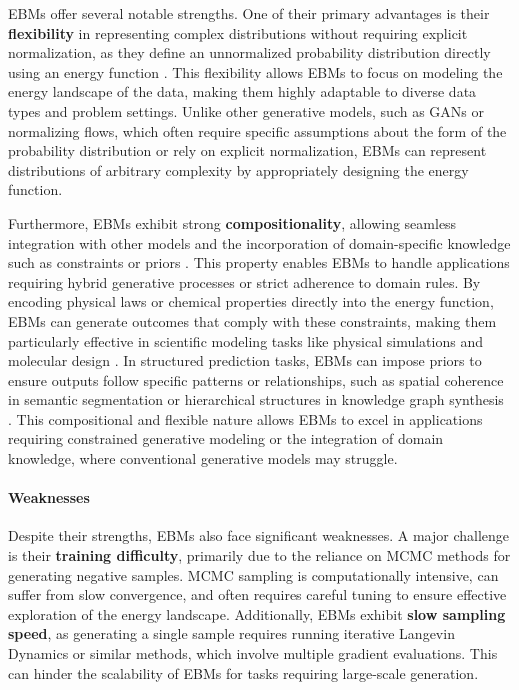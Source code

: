 EBMs offer several notable strengths. One of their primary advantages is their \textbf{flexibility} in representing complex distributions without requiring explicit normalization, as they define an unnormalized probability distribution directly using an energy function \cite{lecun2006tutorial}. This flexibility allows EBMs to focus on modeling the energy landscape of the data, making them highly adaptable to diverse data types and problem settings. Unlike other generative models, such as GANs or normalizing flows, which often require specific assumptions about the form of the probability distribution or rely on explicit normalization, EBMs can represent distributions of arbitrary complexity by appropriately designing the energy function.

Furthermore, EBMs exhibit strong \textbf{compositionality}, allowing seamless integration with other models and the incorporation of domain-specific knowledge such as constraints or priors \cite{du2019implicit, grathwohl2020your}. This property enables EBMs to handle applications requiring hybrid generative processes or strict adherence to domain rules. By encoding physical laws or chemical properties directly into the energy function, EBMs can generate outcomes that comply with these constraints, making them particularly effective in scientific modeling tasks like physical simulations and molecular design \cite{du2019implicit}. In structured prediction tasks, EBMs can impose priors to ensure outputs follow specific patterns or relationships, such as spatial coherence in semantic segmentation or hierarchical structures in knowledge graph synthesis \cite{grathwohl2020your, lecun2006tutorial}. This compositional and flexible nature allows EBMs to excel in applications requiring constrained generative modeling or the integration of domain knowledge, where conventional generative models may struggle.

\paragraph{Weaknesses}

Despite their strengths, EBMs also face significant weaknesses. A major challenge is their \textbf{training difficulty}, primarily due to the reliance on MCMC methods for generating negative samples. MCMC sampling is computationally intensive, can suffer from slow convergence, and often requires careful tuning to ensure effective exploration of the energy landscape. Additionally, EBMs exhibit \textbf{slow sampling speed}, as generating a single sample requires running iterative Langevin Dynamics or similar methods, which involve multiple gradient evaluations. This can hinder the scalability of EBMs for tasks requiring large-scale generation.



